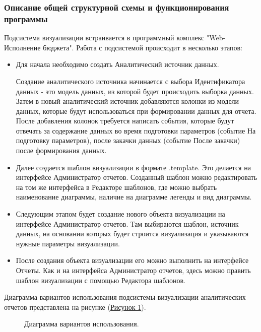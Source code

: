 \documentclass[a4paper]{extarticle}
\begin{document}
\subsubsection{Описание общей структурной схемы и функционирования программы}
Подсистема визуализации встраивается в программный комплекс "Web-Исполнение бюджета". Работа с подсистемой происходит в несколько этапов:\par
\begin{itemize}
  \item Для начала необходимо создать Аналитический источник данных.\par
  Создание аналитического источника начинается с выбора Идентификатора данных - это модель данных, из которой будет происходить выборка данных. Затем в новый аналитический источник добавляются колонки из модели данных, которые будут использоваться при формировании данных для отчета. После добавления колонок требуется написать события, которые будут отвечать за содержание данных во время подготовки параметров (событие На подготовку параметров), после закачки данных (событие После закачки) после формирования данных.
  \item Далее создается шаблон визуализации в формате .template. Это делается на интерфейсе Администратор отчетов.
  Созданный шаблон можно редактировать на том же интерфейса в Редакторе шаблонов, где можно выбрать наименование диаграммы, наличие на диаграмме легенды и вид диаграммы.
  \item Следующим этапом будет создание нового объекта визуализации на интерфейсе Администратор отчетов. Там выбираются шаблон, источник данных, на основании которых будет строится визуализация и указываются нужные параметры визуализации.
  \item После создания объекта визуализации его можно выполнить на интерфейсе Отчеты. Как и на интерфейса Администратор отчетов, здесь можно править шаблон визуализации с помощью Редактора шаблонов.
\end{itemize}\par
Диаграмма вариантов использования подсистемы визуализации аналитических отчетов представлена на рисунке (\hyperref[img1]{Рисунок 1}).
\begin{figure}[H]
\label{img1}\caption{Диаграмма вариантов использования.}
\label{ris:image}
\end{figure}\par
\end{document}

